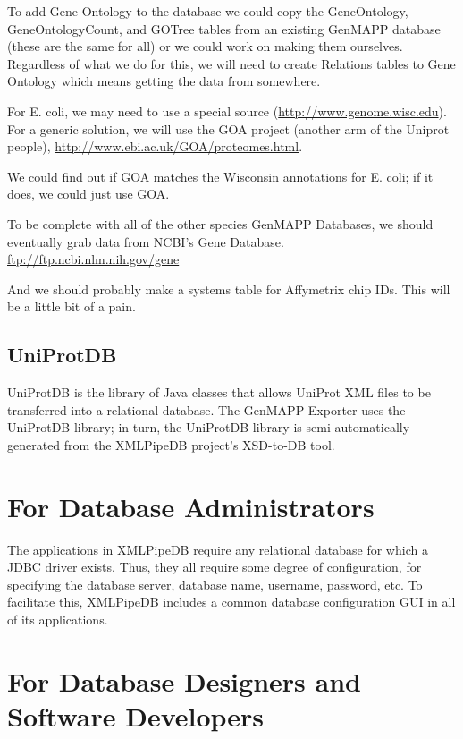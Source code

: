 \documentclass[11pt]{article}
\begin{document}
\begin{enumerate}
{To add Gene Ontology to the database we could copy the GeneOntology, GeneOntologyCount, and GOTree tables from an existing GenMAPP database (these are the same for all) or we could work on making them ourselves.  Regardless of what we do for this, we will need to create Relations tables to Gene Ontology which means getting the data from somewhere.

For E. coli, we may need to use a special source (\url{http://www.genome.wisc.edu}).  For a generic solution, we will use the GOA project (another arm of the Uniprot people), \url{http://www.ebi.ac.uk/GOA/proteomes.html}.

We could find out if GOA matches the Wisconsin annotations for E. coli; if it does, we could just use GOA.

To be complete with all of the other species GenMAPP Databases, we should eventually grab data from NCBI's Gene Database.  \url{ftp://ftp.ncbi.nlm.nih.gov/gene}

And we should probably make a systems table for Affymetrix chip IDs.  This will be a little bit of a pain.}
\end{enumerate}

\subsection{UniProtDB}

UniProtDB is the library of Java classes that allows UniProt XML files to be transferred into a relational database.  The GenMAPP Exporter uses the UniProtDB library; in turn, the UniProtDB library is semi-automatically generated from the XMLPipeDB project's XSD-to-DB tool.

\section{For Database Administrators}
\label{for-dba}

The applications in XMLPipeDB require any relational database for which a JDBC driver exists.  Thus, they all require some degree of configuration, for specifying the database server, database name, username, password, etc.  To facilitate this, XMLPipeDB includes a common database configuration GUI in all of its applications.

\section{For Database Designers and Software Developers}
\label{for-dev}
\end{document}
